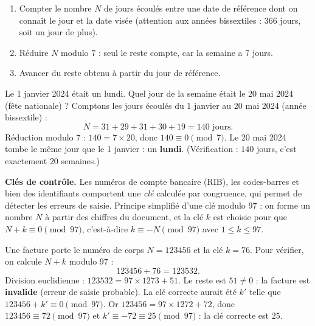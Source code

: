 \documentclass[11pt]{article}
\begin{document}
\begin{methode}
\begin{enumerate}
\item Compter le nombre $N$ de jours écoulés entre une date de référence dont on connaît le jour et la date visée (attention aux années bissextiles : $366$ jours, soit un jour de plus).
\item Réduire $N$ modulo $7$ : seul le reste compte, car la semaine a $7$ jours.
\item Avancer du reste obtenu à partir du jour de référence.
\end{enumerate}
\end{methode}

\begin{exoresolu}
Le 1\ier{} janvier 2024 était un lundi. Quel jour de la semaine était le 20 mai 2024 (fête nationale) ?
\tcblower
Comptons les jours écoulés du 1\ier{} janvier au 20 mai 2024 (année bissextile) :
\[ N = 31 + 29 + 31 + 30 + 19 = 140 \text{ jours}. \]
Réduction modulo $7$ : $140 = 7 \times 20$, donc $140 \equiv 0 \pmod{7}$. Le 20 mai 2024 tombe le même jour que le 1\ier{} janvier : un \textbf{lundi}. (Vérification : $140$ jours, c'est exactement $20$ semaines.)
\end{exoresolu}

\textbf{Clés de contrôle.} Les numéros de compte bancaire (RIB), les codes-barres et bien des identifiants comportent une \emph{clé} calculée par congruence, qui permet de détecter les erreurs de saisie. Principe simplifié d'une clé modulo $97$ : on forme un nombre $N$ à partir des chiffres du document, et la clé $k$ est choisie pour que $N + k \equiv 0 \pmod{97}$, c'est-à-dire $k \equiv -N \pmod{97}$ avec $1 \le k \le 97$.

\begin{exemplebox}
Une facture porte le numéro de corps $N = 123456$ et la clé $k = 76$. Pour vérifier, on calcule $N + k$ modulo $97$ :
\[ 123456 + 76 = 123532. \]
Division euclidienne : $123532 = 97 \times 1273 + 51$. Le reste est $51 \neq 0$ : la facture est \textbf{invalide} (erreur de saisie probable). La clé correcte aurait été $k'$ telle que $123456 + k' \equiv 0 \pmod{97}$. Or $123456 = 97 \times 1272 + 72$, donc $123456 \equiv 72 \pmod{97}$ et $k' \equiv -72 \equiv 25 \pmod{97}$ : la clé correcte est $25$.
\end{exemplebox}
\end{document}
